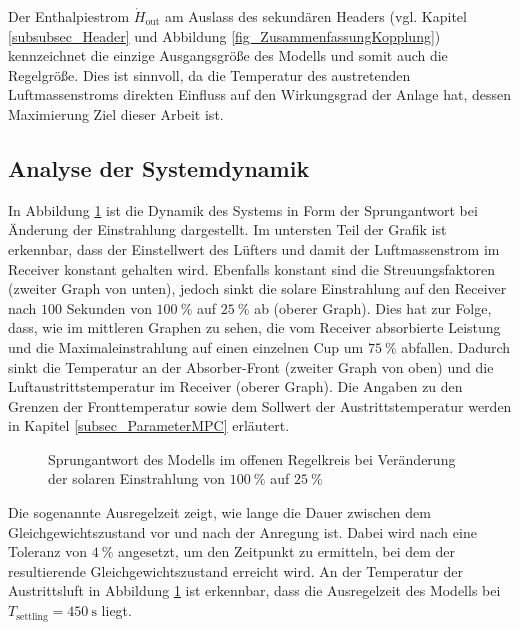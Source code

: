 Der Enthalpiestrom $\dot{H}_{\mathrm{out}}$ am Auslass des sekundären Headers (vgl. Kapitel \ref{subsubsec_Header} und Abbildung \ref{fig_ZusammenfassungKopplung}) kennzeichnet die einzige Ausgangsgröße des Modells und somit auch die Regelgröße.
Dies ist sinnvoll, da die Temperatur des austretenden Luftmassenstroms direkten Einfluss auf den Wirkungsgrad der Anlage hat, dessen Maximierung Ziel dieser Arbeit ist.

\subsection{Analyse der Systemdynamik} \label{subsec_Systemdynamik}
In Abbildung \ref{fig_Sprungantwort} ist die Dynamik des Systems in Form der Sprungantwort bei Änderung der Einstrahlung dargestellt.
Im untersten Teil der Grafik ist erkennbar, dass der Einstellwert des Lüfters und damit der Luftmassenstrom im Receiver konstant gehalten wird.
Ebenfalls konstant sind die Streuungsfaktoren (zweiter Graph von unten), jedoch sinkt die solare Einstrahlung auf den Receiver nach $100$ Sekunden von $\SI{100}{\percent}$ auf $\SI{25}{\percent}$ ab (oberer Graph).
Dies hat zur Folge, dass, wie im mittleren Graphen zu sehen, die vom Receiver absorbierte Leistung und die Maximaleinstrahlung auf einen einzelnen Cup um $\SI{75}{\percent}$ abfallen.
Dadurch sinkt die Temperatur an der Absorber-Front (zweiter Graph von oben) und die Luftaustrittstemperatur im Receiver (oberer Graph).
Die Angaben zu den Grenzen der Fronttemperatur sowie dem Sollwert der Austrittstemperatur werden in Kapitel \ref{subsec_ParameterMPC} erläutert.

\begin{figure}[h!]
    \centering
    \setlength{\fboxsep}{1pt}
    \setlength{\fboxrule}{1pt}
    \caption[Sprungantwort des Modells im offenen Regelkreis bei Veränderung der solaren Einstrahlung von $\SI{100}{\percent}$ auf $\SI{25}{\percent}$]{Sprungantwort des Modells im offenen Regelkreis bei Veränderung der solaren Einstrahlung von $\SI{100}{\percent}$ auf $\SI{25}{\percent}$}
    \label{fig_Sprungantwort}
\end{figure}

Die sogenannte Ausregelzeit zeigt, wie lange die Dauer zwischen dem Gleichgewichtszustand vor und nach der Anregung ist.
Dabei wird nach \cite[S.223]{Zacher} eine Toleranz von $\SI{4}{\percent}$ angesetzt, um den Zeitpunkt zu ermitteln, bei dem der resultierende Gleichgewichtszustand erreicht wird.
An der Temperatur der Austrittsluft in Abbildung \ref{fig_Sprungantwort} ist erkennbar, dass die Ausregelzeit des Modells bei $T_{\mathrm{settling}} = \SI{450}{\second}$ liegt.

